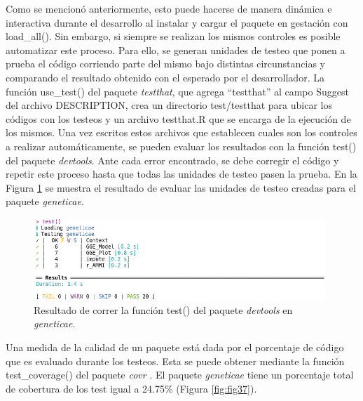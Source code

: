 Como se mencionó anteriormente, esto puede hacerse de manera dinámica e interactiva durante el desarrollo al instalar y cargar el paquete en gestación con \textcolor{fandango}{load\_all()}. Sin embargo, si siempre se realizan los mismos controles es posible automatizar este proceso. Para ello, se generan unidades de testeo que ponen a prueba el código corriendo parte del mismo bajo distintas circunstancias y comparando el resultado obtenido con el esperado por el desarrollador.  La función \textcolor{fandango}{use\_test()} del paquete \emph{testthat}, que agrega ``testthat'' al campo Suggest del archivo DESCRIPTION, crea un directorio test/testthat para ubicar los códigos con los testeos y un archivo testthat.R que se encarga de la ejecución de los mismos. Una vez escritos estos archivos que establecen cuales son los controles a realizar automáticamente, se pueden evaluar los resultados con la función \textcolor{fandango}{test()} del paquete \emph{devtools}. Ante cada error encontrado, se debe corregir el código y repetir este proceso hasta que todas las unidades de testeo pasen la prueba. En la Figura \ref{fig:fig36} se muestra el resultado de evaluar las unidades de testeo creadas para el paquete \emph{geneticae}.

\begin{figure}[H]
	\begin{center}
		\includegraphics[width=11cm]{./Graficos/Test.png}	
	\end{center}
	\caption{Resultado de correr la función \textcolor{fandango}{test()} del paquete \emph{devtools} en \emph{geneticae}.}
	\label{fig:fig36}
\end{figure}

Una medida de la calidad de un paquete está dada por el porcentaje de código que es evaluado durante los testeos. Esta se puede obtener mediante la función \textcolor{fandango}{test\_coverage()} del paquete \emph{covr} \citep{Hester2020}. El paquete \emph{geneticae} tiene un porcentaje total de cobertura de los test igual a 24.75\% (Figura \ref{fig:fig37}).


